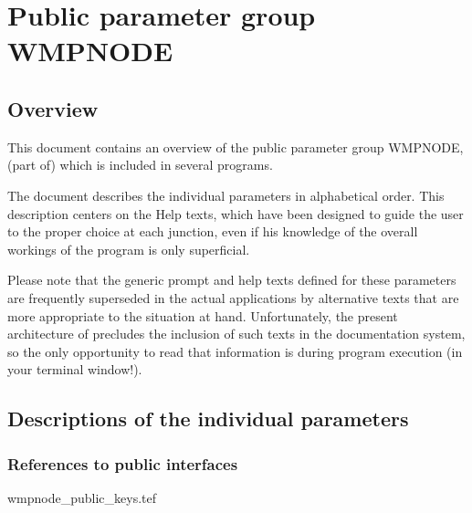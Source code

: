 
\chapter{ Public parameter group WMPNODE}
\tableofcontents


\section{ Overview}

	This document contains an overview of the public parameter group
WMPNODE, (part of) which is included in several \NEWSTAR programs.



	The
document describes the individual parameters in alphabetical order. This
description centers on the Help texts, which have been designed to guide the
user to the proper choice at each junction, even if his knowledge of the
overall workings of the program is only superficial.

	Please note that the generic prompt and help texts defined for these
parameters are frequently superseded in the actual applications by alternative
texts that are more appropriate to the situation at hand. Unfortunately, the
present architecture of \NEWSTAR precludes the inclusion of such texts in the
documentation system, so the only opportunity to read that information is
during program execution (in your terminal window!).


\section{ Descriptions of the individual parameters}
\label{.descriptions}

\subsection{ References to public interfaces}
\label{.public}

 {wmpnode_public_keys.tef}
